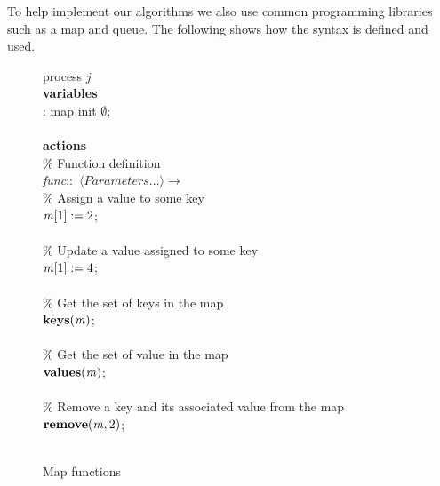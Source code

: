 To help implement our algorithms we also use common programming libraries such as a map and queue. The following shows how the syntax is defined and used.

\begin{figure}[H]
  \centering
  \begin{boxedminipage}{\linewidth}
    \null process $j$\\
    \null \textbf{variables}\\
    \null\qq {}: map init $\emptyset$;\\~\\
    \null \textbf{actions}\\
    \null\qq \% Function definition\\
    \null\qq \emph{func}::~$\langle Parameters...\rangle \rightarrow$\\
    \null\qq\qq \% Assign a value to some key\\
    \null\qq\qq $\mbox{\emph{m}}[1] \mathrel{:=} 2$;\\~\\
    \null\qq\qq \% Update a value assigned to some key\\
    \null\qq\qq $\mbox{\emph{m}}[1] \mathrel{:=} 4$;\\~\\
    \null\qq\qq \% Get the set of keys in the map\\
    \null\qq\qq $\mbox{\textbf{keys}}(\mbox{\emph{m}})$;\\~\\
    \null\qq\qq \% Get the set of value in the map\\
    \null\qq\qq $\mbox{\textbf{values}}(\mbox{\emph{m}})$;\\~\\
    \null\qq\qq \% Remove a key and its associated value from the map\\
    \null\qq\qq $\mbox{\textbf{remove}}(\mbox{\emph{m}}, 2)$;\\~\\
  \end{boxedminipage}
  \caption{Map functions}
\end{figure}


